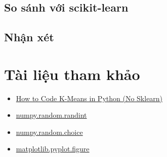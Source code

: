 \documentclass{article}
\begin{document}
\subsection{So sánh với scikit-learn}
\subsection{Nhận xét}

\newpage
\section{Tài liệu tham khảo}
\begin{itemize}
    \item \href{https://youtu.be/uLs-EYUpGAw?t=231}{How to Code K-Means in Python (No Sklearn)}
    \item \href{https://numpy.org/doc/stable/reference/random/generated/numpy.random.randint.html}{numpy.random.randint}
    \item \href{https://numpy.org/doc/stable/reference/random/generated/numpy.random.choice.html}{numpy.random.choice}
    \item \href{https://matplotlib.org/stable/api/_as_gen/matplotlib.pyplot.figure.html}{matplotlib.pyplot.figure}
\end{itemize}
\end{document}
